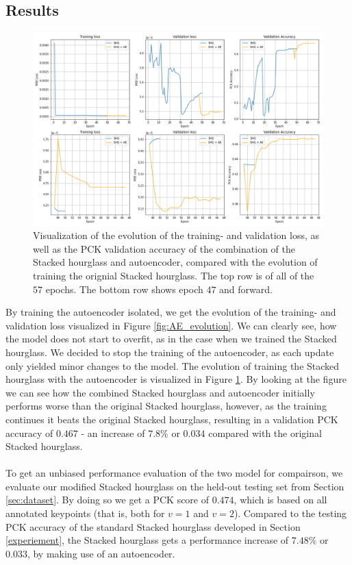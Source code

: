 \documentclass[./main.tex]{subfiles}
\begin{document}
\subsection{Results}\label{sec:improv_results}
\begin{figure}[htbp]
    \centering
    \includegraphics[width = \textwidth - 1 cm]{entities//SHG_AE_Evolution.png}
    \caption{Visualization of the evolution of the training- and validation loss, as well as the PCK validation accuracy of the combination of the Stacked hourglass and autoencoder, compared with the evolution of training the orignial Stacked hourglass. The top row is of all of the $57$ epochs. The bottom row shows epoch $47$ and forward.}
    \label{fig:SHG_AE_evolution}
\end{figure}
\noindent By training the autoencoder isolated, we get the evolution of the training- and validation loss visualized in Figure \ref{fig:AE_evolution}. We can clearly see, how the model does not start to overfit, as in the case when we trained the Stacked hourglass. We decided to stop the training of the autoencoder, as each update only yielded minor changes to the model. The evolution of training the Stacked hourglass with the autoencoder is visualized in Figure \ref{fig:SHG_AE_evolution}. By looking at the figure we can see how the combined Stacked hourglass and autoencoder initially performs worse than the original Stacked hourglass, however, as the training continues it beats the original Stacked hourglass, resulting in a validation PCK accuracy of $0.467$ - an increase of $7.8\%$ or $0.034$ compared with the original Stacked hourglass.
\\
\\
To get an unbiased performance evaluation of the two model for compairson, we evaluate our modified Stacked hourglass on the held-out testing set from Section \ref{sec:dataset}. By doing so we get a PCK score of $0.474$, which is based on all annotated keypoints (that is, both for $v = 1$ and $v = 2$). Compared to the testing PCK accuracy of the standard Stacked hourglass developed in Section \ref{experiement}, the Stacked hourglass gets a performance increase of $7.48\%$ or $0.033$, by making use of an autoencoder.
\end{document}
